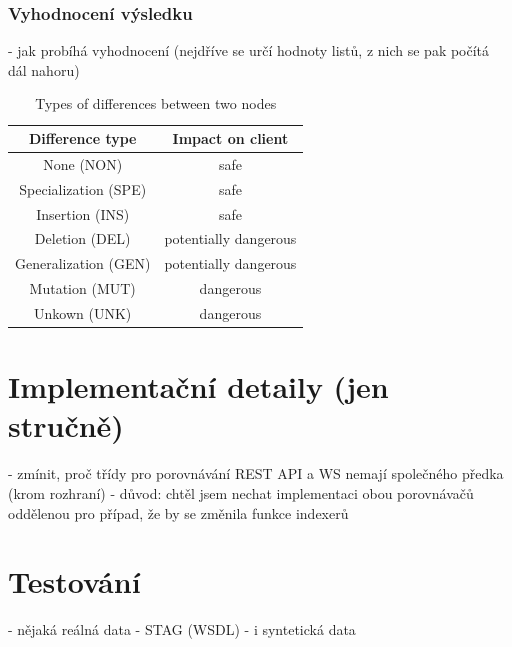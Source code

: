 \documentclass[czech,DP]{thesiskiv}
\begin{document}
\subsection{Vyhodnocení výsledku}

- jak probíhá vyhodnocení (nejdříve se určí hodnoty listů, z nich se pak počítá dál nahoru)

\begin{table}[h!]
	\centering
	\begin{tabular}{c|c}
		Difference type & Impact on client  \\
		\hline
		None (NON) & safe \\
		Specialization (SPE) & safe  \\
		Insertion (INS) & safe \\
		Deletion (DEL) & potentially dangerous \\
		Generalization (GEN) & potentially dangerous \\
		Mutation (MUT) & dangerous \\
		Unkown (UNK) & dangerous
	\end{tabular}
	\caption{Types of differences between two nodes }
	\label{tab:diff-level}
\end{table}

\chapter{Implementační detaily (jen stručně)}

 - zmínit, proč třídy pro porovnávání REST API a WS nemají společného předka (krom rozhraní)
 	- důvod: chtěl jsem nechat implementaci obou porovnávačů oddělenou pro případ, že by se změnila funkce indexerů

\chapter{Testování}

- nějaká reálná data
	- STAG (WSDL)
- i syntetická data
 
% 
%

{\raggedright\small

}
\end{document}

